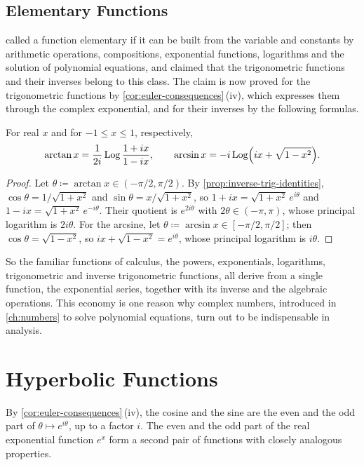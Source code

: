 \subsection{Elementary Functions}

 called a function elementary if it can be built from the variable and constants by arithmetic operations, compositions, exponential functions, logarithms and the solution of polynomial equations, and claimed that the trigonometric functions and their inverses belong to this class. The claim is now proved for the trigonometric functions by \cref{cor:euler-consequences}\,(iv), which expresses them through the complex exponential, and for their inverses by the following formulas.

\begin{proposition}
\label{prop:inverse-trig-log}
For real $x$ and for $-1\le x\le1$, respectively,
\[
\arctan x=\frac1{2i}\operatorname{Log}\frac{1+ix}{1-ix},\qquad\arcsin x=-i\operatorname{Log}\Bigl(ix+\sqrt{1-x^2}\Bigr).
\]
\end{proposition}

\begin{proof}
Let $\theta\coloneqq\arctan x\in(-\pi/2,\pi/2)$. By \cref{prop:inverse-trig-identities}, $\cos\theta=1/\sqrt{1+x^2}$ and $\sin\theta=x/\sqrt{1+x^2}$, so $1+ix=\sqrt{1+x^2}\,e^{i\theta}$ and $1-ix=\sqrt{1+x^2}\,e^{-i\theta}$. Their quotient is $e^{2i\theta}$ with $2\theta\in(-\pi,\pi)$, whose principal logarithm is $2i\theta$. For the arcsine, let $\theta\coloneqq\arcsin x\in[-\pi/2,\pi/2]$; then $\cos\theta=\sqrt{1-x^2}$, so $ix+\sqrt{1-x^2}=e^{i\theta}$, whose principal logarithm is $i\theta$.
\end{proof}

So the familiar functions of calculus, the powers, exponentials, logarithms, trigonometric and inverse trigonometric functions, all derive from a single function, the exponential series, together with its inverse and the algebraic operations. This economy is one reason why complex numbers, introduced in \cref{ch:numbers} to solve polynomial equations, turn out to be indispensable in analysis.

\section{Hyperbolic Functions}
\label{sec:hyperbolic}

By \cref{cor:euler-consequences}\,(iv), the cosine and the sine are the even and the odd part of $\theta\mapsto e^{i\theta}$, up to a factor $i$. The even and the odd part of the real exponential function $e^x$ form a second pair of functions with closely analogous properties.

